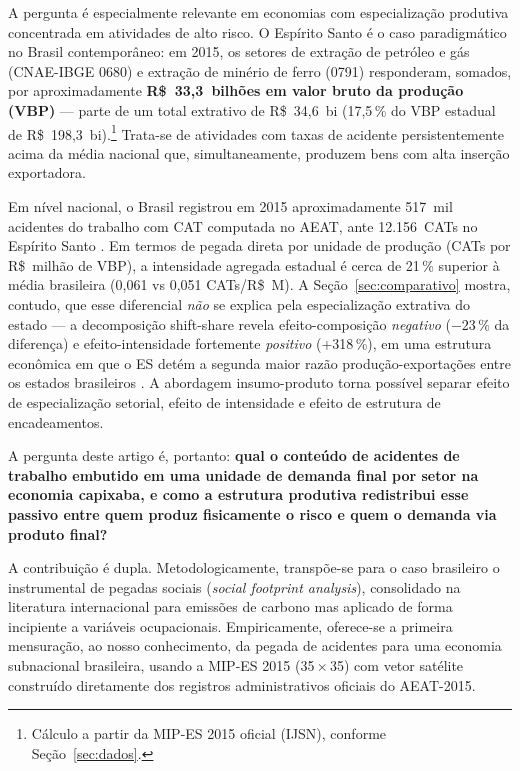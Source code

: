 \documentclass[12pt, a4paper]{article}
\begin{document}
A pergunta é especialmente relevante em economias com especialização
produtiva concentrada em atividades de alto risco. O Espírito Santo é
o caso paradigmático no Brasil contemporâneo: em 2015, os setores de
extração de petróleo e gás (CNAE-IBGE 0680) e extração de minério de
ferro (0791) responderam, somados, por aproximadamente
\textbf{R\$~33,3~bilhões em valor bruto da produção (VBP)} ---
parte de um total extrativo de R\$~34,6~bi (17,5\,\% do VBP estadual
de R\$~198,3~bi).\footnote{Cálculo a partir da MIP-ES 2015 oficial
(IJSN), conforme Seção~\ref{sec:dados}.}
Trata-se de atividades com taxas de acidente persistentemente acima
da média nacional que, simultaneamente, produzem bens com alta
inserção exportadora.

Em nível nacional, o Brasil registrou em 2015 aproximadamente
517~mil acidentes do trabalho com CAT computada no AEAT, ante
12.156~CATs no Espírito Santo \citep{aeat2016}. Em termos de pegada
direta por unidade de produção (CATs por R\$~milhão de VBP), a
intensidade agregada estadual é cerca de 21\,\% superior à média
brasileira (0{,}061 vs 0{,}051 CATs/R\$~M). A Seção~\ref{sec:comparativo}
mostra, contudo, que esse diferencial \textit{não} se explica
pela especialização extrativa do estado --- a decomposição shift-share
revela efeito-composição \textit{negativo} ($-23\,\%$ da diferença) e
efeito-intensidade fortemente \textit{positivo} (+318\,\%), em uma
estrutura econômica em que o ES detém a segunda maior razão
produção-exportações entre os estados brasileiros
\citep{haddad2017iioas}. A abordagem insumo-produto torna possível
separar efeito de especialização setorial, efeito de intensidade e
efeito de estrutura de encadeamentos.

A pergunta deste artigo é, portanto: \textbf{qual o conteúdo de
acidentes de trabalho embutido em uma unidade de demanda final por
setor na economia capixaba, e como a estrutura produtiva redistribui
esse passivo entre quem produz fisicamente o risco e quem o demanda
via produto final?}

A contribuição é dupla. Metodologicamente, transpõe-se para o caso
brasileiro o instrumental de pegadas sociais (\textit{social footprint
analysis}), consolidado na literatura internacional para emissões de
carbono mas aplicado de forma incipiente a variáveis ocupacionais.
Empiricamente, oferece-se a primeira mensuração, ao nosso conhecimento,
da pegada de acidentes para uma economia subnacional brasileira,
usando a MIP-ES 2015 (35\,$\times$\,35) com vetor satélite construído
diretamente dos registros administrativos oficiais do AEAT-2015.
\end{document}
